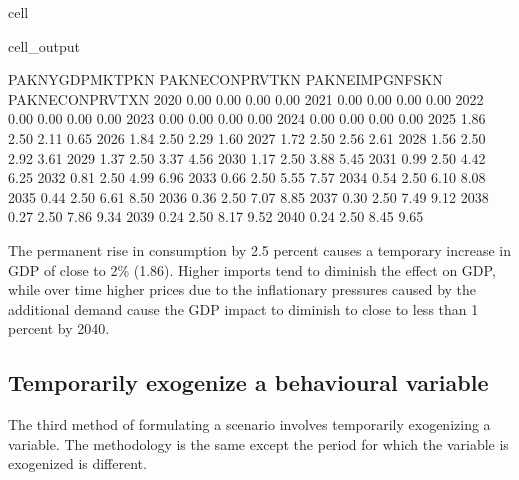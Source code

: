 \documentclass[letterpaper,10pt,english]{jupyterBook}
\begin{document}
\begin{sphinxuseclass}{cell}
\begin{sphinxVerbatimOutput}
\begin{sphinxuseclass}{cell_output}
\begin{sphinxVerbatim}[commandchars=\\\{\}]
      PAKNYGDPMKTPKN  PAKNECONPRVTKN  PAKNEIMPGNFSKN  PAKNECONPRVTXN
2020            0.00            0.00            0.00            0.00
2021           \PYGZhy{}0.00            0.00           \PYGZhy{}0.00            0.00
2022           \PYGZhy{}0.00            0.00            0.00            0.00
2023            0.00            0.00            0.00            0.00
2024           \PYGZhy{}0.00            0.00            0.00            0.00
2025            1.86            2.50            2.11            0.65
2026            1.84            2.50            2.29            1.60
2027            1.72            2.50            2.56            2.61
2028            1.56            2.50            2.92            3.61
2029            1.37            2.50            3.37            4.56
2030            1.17            2.50            3.88            5.45
2031            0.99            2.50            4.42            6.25
2032            0.81            2.50            4.99            6.96
2033            0.66            2.50            5.55            7.57
2034            0.54            2.50            6.10            8.08
2035            0.44            2.50            6.61            8.50
2036            0.36            2.50            7.07            8.85
2037            0.30            2.50            7.49            9.12
2038            0.27            2.50            7.86            9.34
2039            0.24            2.50            8.17            9.52
2040            0.24            2.50            8.45            9.65
\end{sphinxVerbatim}

\end{sphinxuseclass}\end{sphinxVerbatimOutput}

\end{sphinxuseclass}
\sphinxAtStartPar
The permanent rise in consumption by 2.5 percent causes a temporary increase in GDP of close to 2\% (1.86). Higher imports tend to diminish the effect on GDP, while over time higher prices due to the inflationary pressures caused by the additional demand cause the GDP impact to diminish to close to less than 1 percent by 2040.


\subsection{Temporarily exogenize a behavioural variable}
\label{\detokenize{content/06_WBModels/LoadingWBModel:temporarily-exogenize-a-behavioural-variable}}
\sphinxAtStartPar
The third method of formulating a scenario involves temporarily exogenizing a variable.    The methodology is the same except the period for which the variable is exogenized is different.
\end{document}
